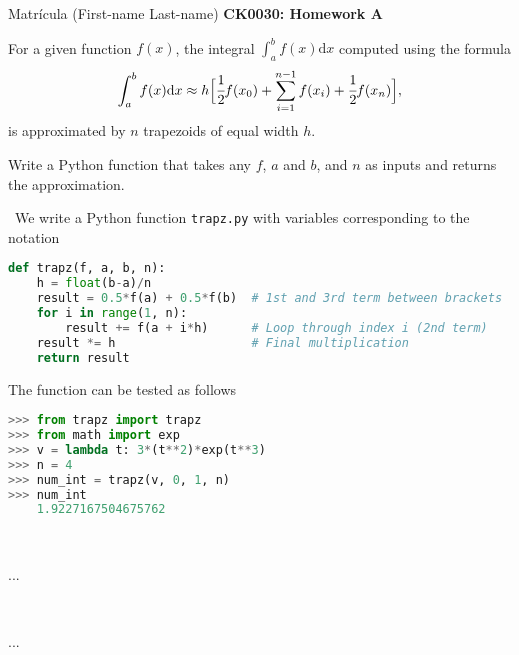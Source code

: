 \documentclass[11pt]{article}
\newenvironment{EX}[2][Exercise]{\begin{trivlist}
\item[{\color{red} \hskip \labelsep {\bfseries #1}\hskip \labelsep {\bfseries #2.}}]}{\end{trivlist}}
\newenvironment{SL}[1][Solution]{\begin{trivlist}
\item[{\color{blue} \hskip \labelsep {\bfseries #1:}}]}{\end{trivlist}}
\begin{document}

\noindent Matr\'icula (First-name Last-name) \hfill {\Large \bfseries CK0030: Homework A} \\

\begin{EX}{A.1}
For a given function $f(x)$, the integral $\int_{a}^{b}{f(x)\text{d}x}$ computed using the formula
\begin{equation}
\int_{a}^{b}{f(x)\text{d}x} \approx h \Big[ \cfrac{1}{2}f(x_0) + \sum_{i=1}^{n-1}{f(x_i) + \cfrac{1}{2}f(x_n)} \Big], 
\end{equation}
is approximated by $n$ trapezoids of equal width $h$. 

\noindent Write a Python function that takes any $f$, $a$ and $b$, and $n$ as inputs and returns the approximation. 
\end{EX}

\begin{SL}\
We write a Python function \texttt{trapz.py} with variables corresponding to the notation
\begin{lstlisting}[language=Python]
def trapz(f, a, b, n):
    h = float(b-a)/n
    result = 0.5*f(a) + 0.5*f(b)  # 1st and 3rd term between brackets 
    for i in range(1, n):
        result += f(a + i*h)      # Loop through index i (2nd term)
    result *= h                   # Final multiplication
    return result
\end{lstlisting}
The function can be tested as follows
\begin{lstlisting}[language=Python]
>>> from trapz import trapz
>>> from math import exp
>>> v = lambda t: 3*(t**2)*exp(t**3)
>>> n = 4
>>> num_int = trapz(v, 0, 1, n)
>>> num_int
    1.9227167504675762
\end{lstlisting}
\end{SL}


\begin{EX}{A.2} \

...
\end{EX}

\begin{SL} \

...
\end{SL}

\end{document}

